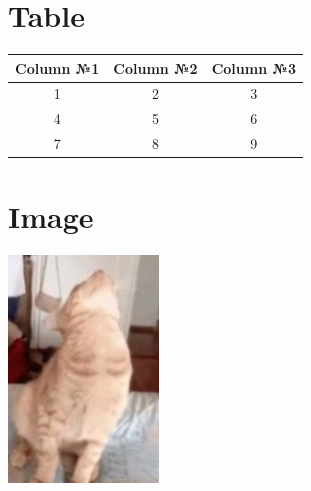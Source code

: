 \documentclass{article}
\begin{document}
\section{Table}
\begin{tabular}{|c|c|c|}
\hline
Column №1 & Column №2 & Column №3 \\
\hline
1 & 2 & 3 \\
\hline
4 & 5 & 6 \\
\hline
7 & 8 & 9 \\
\hline
\end{tabular}


\section{Image}
\includegraphics[width=4cm]{hw2/artifacts/test.png}
\end{document}
